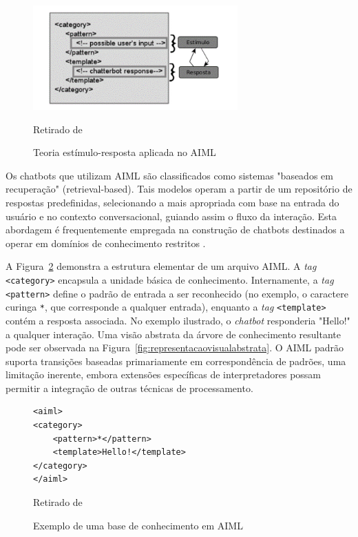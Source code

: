 \documentclass[14pt,a4paper,oneside]{book}
\begin{document}
\begin{figure}
    \centering
    \caption{Teoria estímulo-resposta aplicada no AIML}
    \includegraphics[width=0.7\textwidth]{./fig/image10.png} %
    \label{fig:teoriaestimulo}
    \vspace{0.2cm}
    {\footnotesize 
	
	Retirado de \cite{Lima2017}}
\end{figure}

Os chatbots que utilizam AIML são classificados como sistemas "baseados em recuperação" (retrieval-based). 
Tais modelos operam a partir de um repositório de respostas predefinidas, selecionando a mais apropriada com base na entrada do usuário e no contexto conversacional, guiando assim o fluxo da interação. 
Esta abordagem é frequentemente empregada na construção de chatbots destinados a operar em domínios de conhecimento restritos \cite{Borah2019}.

A Figura~\ref{fig:exemplodeumabase} demonstra a estrutura elementar de um arquivo AIML. A \emph{tag} \texttt{<category>} encapsula a unidade básica de conhecimento. 
Internamente, a \emph{tag} \texttt{<pattern>} define o padrão de entrada a ser reconhecido (no exemplo, o caractere curinga \texttt{*}, que corresponde a qualquer entrada), enquanto a \emph{tag} \texttt{<template>} contém a resposta associada. No exemplo ilustrado, o \emph{chatbot} responderia "Hello!" a qualquer interação. Uma visão abstrata da árvore de conhecimento resultante pode ser observada na Figura~\ref{fig:representacaovisualabstrata}. 
O AIML padrão suporta transições baseadas primariamente em correspondência de padrões, uma limitação inerente, embora extensões específicas de interpretadores possam permitir a integração de outras técnicas de processamento.

\begin{figure}
	\centering
	\caption{Exemplo de uma base de conhecimento em AIML}
	\begin{lstlisting}
<aiml>
<category>
	<pattern>*</pattern>
	<template>Hello!</template>
</category>
</aiml>
	\end{lstlisting}	
	\label{fig:exemplodeumabase}
	\vspace{0.2cm} %
    {\footnotesize 
	
	Retirado de \cite{Wallace2000}}
\end{figure}
\end{document}
